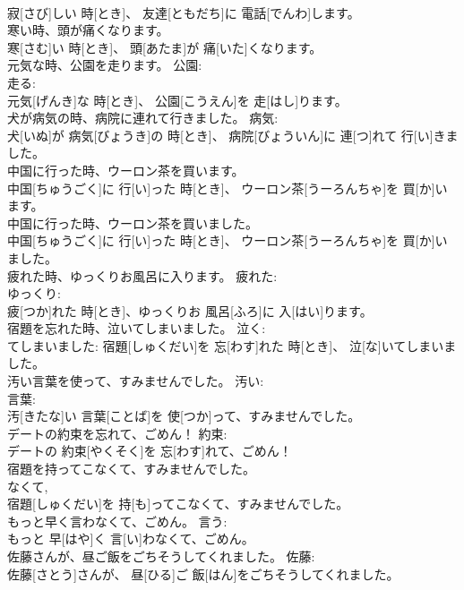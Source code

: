 \documentclass[8pt]{extreport}
\begin{document}
\begin{CJK}{UTF8}{min}
\\	寂[さび]しい 時[とき]、 友達[ともだち]に 電話[でんわ]します。	
\\	寒い時、頭が痛くなります。	
\\	寒[さむ]い 時[とき]、 頭[あたま]が 痛[いた]くなります。	
\\	元気な時、公園を走ります。	公園: 
\\	走る: 
\\	元気[げんき]な 時[とき]、 公園[こうえん]を 走[はし]ります。	
\\	犬が病気の時、病院に連れて行きました。	病気: 
\\	犬[いぬ]が 病気[びょうき]の 時[とき]、 病院[びょういん]に 連[つ]れて 行[い]きました。	
\\	中国に行った時、ウーロン茶を買います。	
\\	中国[ちゅうごく]に 行[い]った 時[とき]、 ウーロン茶[うーろんちゃ]を 買[か]います。	
\\	中国に行った時、ウーロン茶を買いました。	
\\	中国[ちゅうごく]に 行[い]った 時[とき]、 ウーロン茶[うーろんちゃ]を 買[か]いました。	
\\	疲れた時、ゆっくりお風呂に入ります。	疲れた: 
\\	ゆっくり: 
\\	疲[つか]れた 時[とき]、ゆっくりお 風呂[ふろ]に 入[はい]ります。	
\\	宿題を忘れた時、泣いてしまいました。	泣く: 
\\	てしまいました:	宿題[しゅくだい]を 忘[わす]れた 時[とき]、 泣[な]いてしまいました。	
\\	汚い言葉を使って、すみませんでした。	汚い: 
\\	言葉: 
\\	汚[きたな]い 言葉[ことば]を 使[つか]って、すみませんでした。	
\\	デートの約束を忘れて、ごめん！	約束: 
\\	デートの 約束[やくそく]を 忘[わす]れて、ごめん！	
\\	宿題を持ってこなくて、すみませんでした。	
\\	なくて, 
\\	宿題[しゅくだい]を 持[も]ってこなくて、すみませんでした。	
\\	もっと早く言わなくて、ごめん。	言う: 
\\	もっと 早[はや]く 言[い]わなくて、ごめん。	
\\	佐藤さんが、昼ご飯をごちそうしてくれました。	佐藤: 
\\	佐藤[さとう]さんが、 昼[ひる]ご 飯[はん]をごちそうしてくれました。	

\end{CJK}
\end{document}
